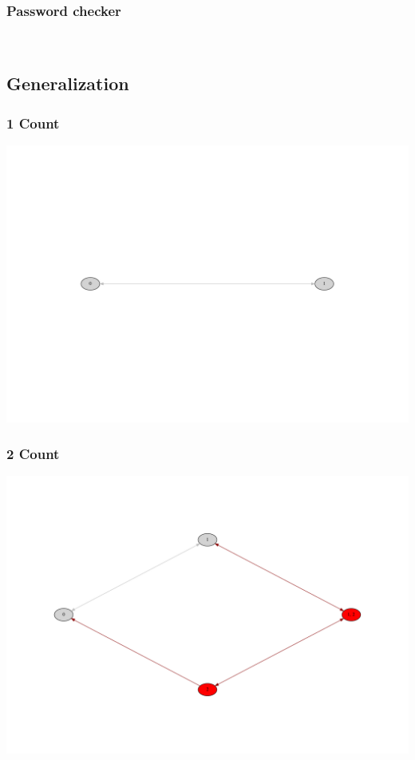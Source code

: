 \documentclass[10pt]{beamer}
\begin{document}
\begin{frame}
  \frametitle{Password checker}
  \centering

  \\
  \scalebox{0.4}{}
\end{frame}

\subsection{Generalization}
\begin{frame}
  \frametitle{1 Count}
  \centering

  \includegraphics[width=\textwidth]{timed_automata/count1.pdf}
\end{frame}

\begin{frame}
  \frametitle{2 Count}
  \centering

  \includegraphics[width=\textwidth]{timed_automata/count2.pdf}
\end{frame}
\end{document}
